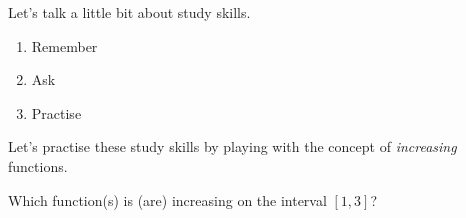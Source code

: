\documentclass[../main.tex]{subfiles}
\begin{document}
  \clearpage
  Let's talk a little bit about study skills. 

  \begin{mdframed}[style=simple]
    \begin{enumerate}
      \item Remember \underline{\hspace{4in}}
      \item Ask \underline{\hspace{4.5in}}
      \item Practise \underline{\hspace{4.2in}} 
    \end{enumerate}
  \end{mdframed}


  \begin{example}
    Let's practise these study skills by playing with the concept of \emph{increasing} functions.

    \faComments{} Which function(s) is (are) increasing on the interval \([1,3]\)?


\end{example}
\end{document}
